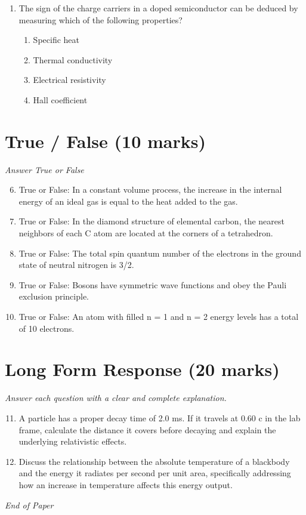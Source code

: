 \documentclass[12pt]{article}
\begin{document}
\begin{enumerate}[label=\arabic*.]
\begin{enumerate}[label=(\alph*)]
    \item 0.1 GeV/$c^2$
    \item 0.2 GeV/$c^2$
    \item 0.5 GeV/$c^2$
    \item 1.0 GeV/$c^2$
\end{enumerate}
\item The sign of the charge carriers in a doped semiconductor can be deduced by measuring which of the following properties?
\begin{enumerate}[label=(\alph*)]
    \item Specific heat
    \item Thermal conductivity
    \item Electrical resistivity
    \item Hall coefficient
\end{enumerate}
\end{enumerate}

\section*{True / False (10 marks)}
\textit{Answer True or False}
\begin{enumerate}[label=\arabic*.]
\setcounter{enumi}{5}
\item True or False: In a constant volume process, the increase in the internal energy of an ideal gas is equal to the heat added to the gas.
\item True or False: In the diamond structure of elemental carbon, the nearest neighbors of each C atom are located at the corners of a tetrahedron.
\item True or False: The total spin quantum number of the electrons in the ground state of neutral nitrogen is 3/2.
\item True or False: Bosons have symmetric wave functions and obey the Pauli exclusion principle.
\item True or False: An atom with filled n = 1 and n = 2 energy levels has a total of 10 electrons.
\end{enumerate}

\section*{Long Form Response (20 marks)}
\textit{Answer each question with a clear and complete explanation.}
\begin{enumerate}[label=\arabic*.]
\setcounter{enumi}{10}
\item A particle has a proper decay time of 2.0 ms. If it travels at 0.60 c in the lab frame, calculate the distance it covers before decaying and explain the underlying relativistic effects.
\item Discuss the relationship between the absolute temperature of a blackbody and the energy it radiates per second per unit area, specifically addressing how an increase in temperature affects this energy output.
\end{enumerate}

\vfill
\noindent\textit{End of Paper}
\end{document}
